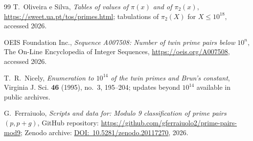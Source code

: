 \documentclass[11pt]{amsart}
\theoremstyle{plain}
\theoremstyle{definition}
\theoremstyle{remark}
\begin{document}
\begin{thebibliography}{99}
T.~Oliveira e Silva,
\emph{Tables of values of $\pi(x)$ and of $\pi_2(x)$},
\url{https://sweet.ua.pt/tos/primes.html}; tabulations of $\pi_2(X)$
for $X \le 10^{18}$, accessed 2026.

OEIS Foundation Inc.,
\emph{Sequence A007508: Number of twin prime pairs below $10^n$},
The On-Line Encyclopedia of Integer Sequences,
\url{https://oeis.org/A007508}, accessed 2026.

T.~R.~Nicely,
\emph{Enumeration to $10^{14}$ of the twin primes and Brun's constant},
Virginia J. Sci. \textbf{46} (1995), no.~3, 195--204; updates beyond
$10^{14}$ available in public archives.

G.~Ferraiuolo,
\emph{Scripts and data for: Modulo 9 classification of prime pairs $(p, p+g)$},
GitHub repository: \url{https://github.com/gferraiuolo2/prime-pairs-mod9};
Zenodo archive: \href{https://doi.org/10.5281/zenodo.20117270}{DOI:~10.5281/zenodo.20117270},
2026.

\end{thebibliography}
\end{document}
